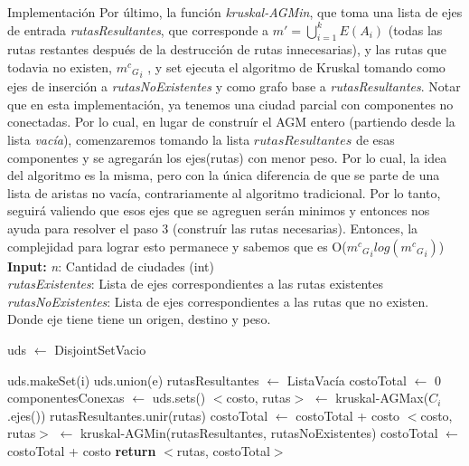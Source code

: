 \documentclass[a4paper]{article}
\begin{document}
\begin{subsection}{Implementaci\'{o}n}
Por \'{u}ltimo, la funci\'{o}n \textit{kruskal-AGMin}, que toma una lista de ejes de entrada \textit{rutasResultantes}, que corresponde a $m' = \bigcup_{i=1}^{k} E(A_i)$ (todas las rutas restantes despu\'{e}s de la destrucci\'{o}n de rutas innecesarias), y las rutas que todavia no existen, ${{m^c}_G}_i$ , y set ejecuta el algoritmo de Kruskal tomando como ejes de inserci\'{o}n a \textit{rutasNoExistentes} y como grafo base a \textit{rutasResultantes}. Notar que en esta implementaci\'{o}n, ya tenemos una ciudad parcial con componentes no conectadas. Por lo cual, en lugar de constru\'{i}r el AGM entero (partiendo desde la lista \textit{vac\'{i}a}), comenzaremos tomando la lista $rutasResultantes$ de esas componentes y se agregar\'{a}n los ejes(rutas) con menor peso. Por lo cual, la idea del algoritmo es la misma, pero con la \'{u}nica diferencia de que se parte de una lista de aristas no vac\'{i}a, contrariamente al algoritmo tradicional. Por lo tanto, seguir\'{a} valiendo que esos ejes que se agreguen ser\'{a}n minimos y entonces nos ayuda para resolver el paso 3 (constru\'{i}r las rutas necesarias). Entonces, la complejidad para lograr esto permanece y sabemos que es O(${{{m^c}_G}_i}log({{{m^c}_G}_i})$)\\

\textbf{Input:} \textit{n}: Cantidad de ciudades (int) \\ 
\hphantom{Input:  } \textit{rutasExistentes}: Lista de ejes correspondientes a las rutas existentes \\
\hphantom{Input:  } \textit{rutasNoExistentes}: Lista de ejes correspondientes a las rutas que no existen.\\
Donde eje tiene tiene un origen, destino y peso.

\begin{algorithm}[H]
  \begin{algorithmic}[1]
  
    \State 	uds $\gets$ DisjointSetVacio
   
     	\State uds.makeSet(i) 
     \EndFor
      
     	\State uds.union(e)
     \EndFor
     \State rutasResultantes $\gets$ ListaVac\'{i}a
     \State costoTotal $\gets$ 0
     \State componentesConexas $\gets$ uds.sets() 
       
		\State $<$costo, rutas$>$ $\gets$ kruskal-AGMax($C_i$.ejes())
        \State rutasResultantes.unir(rutas)
        \State costoTotal $\gets$ costoTotal + costo 
      \EndFor
      \State {}
      \State $<$costo, rutas$>$ $\gets$ kruskal-AGMin(rutasResultantes, rutasNoExistentes) 
      \State costoTotal $\gets$ costoTotal + costo
      \State \textbf{return} $<$rutas, costoTotal$>$
    \EndFunction    
  \end{algorithmic}
\end{algorithm}
\end{subsection}
\end{document}
